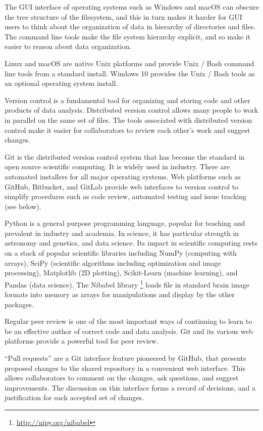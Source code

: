 The GUI interface of operating systems such as Windows and macOS can obscure
the tree structure of the filesystem, and this in turn makes it harder for GUI
users to think about the organization of data in hierarchy of directories and
files.  The command line tools make the file system hierarchy explicit, and so
make it easier to reason about data organization.

Linux and macOS are native Unix platforms and provide Unix / Bash command line
tools from a standard install.  Windows 10 provides the Unix / Bash tools as
an optional operating system install.

Version control is a fundamental tool for organizing and storing code and
other products of data analysis.
Distributed version control allows many people to work in parallel on the
same set of files.
The tools associated with distributed version control make it easier for
collaborators to review each other's work and suggest changes.

Git is the distributed version control system that has become the standard in
open source scientific computing. It is widely used in industry.
There are automated installers for all major operating systems.
Web platforms such as GitHub, Bitbucket, and GitLab provide web interfaces
to version control to simplify procedures such as code review, automated
testing and issue tracking (see below).

Python is a general purpose programming language,
popular for teaching and prevalent in industry and academia.
In science, it has particular strength in
astronomy and genetics, and data science.
Its impact in scientific computing rests on a stack of popular scientific
libraries including NumPy (computing with arrays), SciPy (scientific
algorithms including optimization and image processing), Matplotlib (2D
plotting), Scikit-Learn (machine learning), and Pandas (data science).  The
Nibabel library \footnote{\url{http://nipy.org/nibabel}\label{nibabel}} loads
file in standard brain image formats into memory as arrays for manipulations
and display by the other packages.

Regular peer review is one of the most important ways of continuing to learn
to be an effective author of correct code and data analysis.  Git and its
various web platforms provide a powerful tool for peer review.

``Pull requests'' are a Git interface feature pioneered by GitHub, that
presents proposed changes to the shared repository in a convenient web
interface. This allows collaborators to comment on the changes, ask questions,
and suggest improvements.  The discussion on this interface forms a record of
decisions, and a justification for each accepted set of changes.


